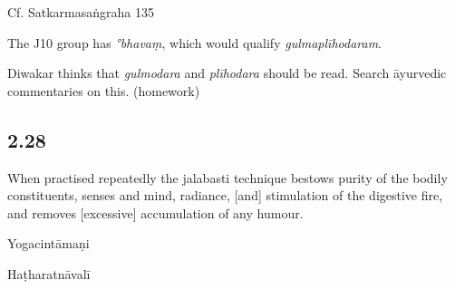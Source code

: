 \begin{ekdosis}
\begin{testimonia}[hp02_027]
Cf. Satkarmasaṅgraha 135

\begin{versinnote}
\end{versinnote}
\end{testimonia}

\begin{philcomm}[hp02_027]
The J10 group has \emph{°bhavaṃ}, which would qualify \emph{gulmaplīhodaram}.

Diwakar thinks that \emph{gulmodara} and \emph{plīhodara} should be read. Search āyurvedic commentaries on this. (homework)
\end{philcomm}

\subsection*{2.28}
\begin{translation}[hp02_028]
When practised repeatedly the jalabasti technique bestows purity of the bodily constituents, senses and mind, radiance, [and] stimulation of the digestive fire, and removes [excessive] accumulation of any humour.
\end{translation}

\begin{sources}[hp02_028]
\end{sources}

\begin{testimonia}[hp02_028]
Yogacintāmaṇi

\begin{versinnote}
\end{versinnote}

Haṭharatnāvalī


\end{testimonia}
\end{ekdosis}
